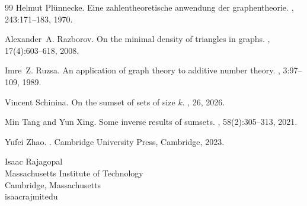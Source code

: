 \documentclass{daj}
\theoremstyle{definition}
\theoremstyle{remark}
\numberwithin{equation}{section}
\numberwithin{theorem}{section}
\begin{document}
\begin{thebibliography}{99}
Helmut Pl{\"{u}}nnecke.
\newblock Eine zahlentheoretische anwendung der graphentheorie.
, 243:171--183, 1970.

Alexander~A. Razborov.
\newblock On the minimal density of triangles in graphs.
, 17(4):603--618, 2008.

Imre~Z. Ruzsa.
\newblock An application of graph theory to additive number theory.
, 3:97--109, 1989.

Vincent Schinina.
\newblock On the sumset of sets of size $k$.
, 26, 2026.

Min Tang and Yun Xing.
\newblock Some inverse results of sumsets.
, 58(2):305--313, 2021.

Yufei Zhao.
.
\newblock Cambridge University Press, Cambridge, 2023.

\end{thebibliography}

\begin{dajauthors}
\begin{authorinfo}[isaac]
    Isaac Rajagopal\\
  Massachusetts Institute of Technology\\
  Cambridge, Massachusetts\\
  isaacraj\imageat{}mit\imagedot{}edu \\
\end{authorinfo}
\end{dajauthors}
\end{document}
